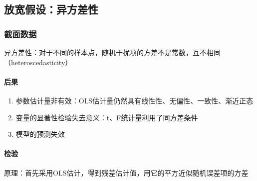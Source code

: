 \documentclass[12pt]{book}
\begin{document}
\subsection{放宽假设：异方差性}


\subsubsection{截面数据}







异方差性：对于不同的样本点，随机干扰项的方差不是常数，互不相同（heteroscedasticity）


\paragraph{后果}

\begin{enumerate}[1.]
    \item 参数估计量非有效：OLS估计量仍然具有线性性、无偏性、一致性、渐近正态
    \item 变量的显著性检验失去意义：t、F统计量利用了同方差条件
    \item 模型的预测失效
\end{enumerate}


\paragraph{检验}

原理：首先采用OLS估计，得到残差估计值，用它的平方近似随机误差项的方差
\end{document}
